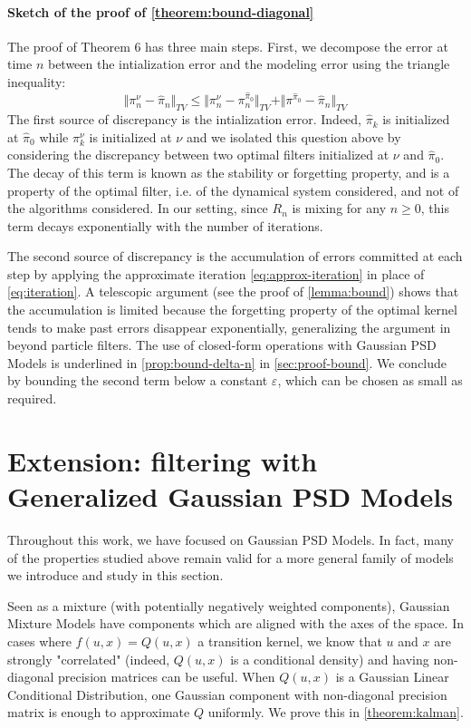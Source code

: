 \paragraph{Sketch of the proof of \cref{theorem:bound-diagonal}}
The proof of Theorem 6 has three main steps. First, we decompose the error at time $n$ between the intialization error and the modeling error using the triangle inequality:
%
\begin{equation*}
\Vert \pi^\nu_n - \hat\pi_n\Vert_{TV} \leq \Vert\pi^\nu_n - \pi^{\hat \pi_0}_n\Vert_{TV} + \Vert\pi^{\hat\pi_0} - \hat \pi_n\Vert_{TV}
\end{equation*}
%
The first source of discrepancy is the intialization error. Indeed, $\hat\pi_k$ is initialized at $\hat \pi_0$ while $\pi_k^\nu$ is initialized at $\nu$ and we isolated this question above by considering the discrepancy between two optimal filters initialized at $\nu$ and $\hat \pi_0$. The decay of this term is known as the stability or forgetting property, and is a property of the optimal filter, i.e. of the dynamical system considered, and not of the algorithms considered. In our setting, since $R_n$ is mixing for any $n\geq 0$, this term decays exponentially with the number of iterations.

The second source of discrepancy is the accumulation of errors committed at each step by applying the approximate iteration \cref{eq:approx-iteration} in place of \cref{eq:iteration}. A telescopic argument (see the proof of \cref{lemma:bound}) shows that the accumulation is limited because the forgetting property of the optimal kernel tends to make past errors disappear exponentially, generalizing the argument in \cite{oudjane} beyond particle filters. The use of closed-form operations with Gaussian PSD Models is underlined in \cref{prop:bound-delta-n} in \cref{sec:proof-bound}. We conclude by bounding the second term below a constant $\varepsilon$, which can be chosen as small as required.

\section{Extension: filtering with Generalized Gaussian PSD Models}\label{sec:generalized-psd-models}
Throughout this work, we have focused on Gaussian PSD Models. In fact, many of the properties studied above remain valid for a more general family of models we introduce and study in this section.

Seen as a mixture (with potentially negatively weighted components), Gaussian Mixture Models have components which are aligned with the axes of the space. In cases where $f(u, x) = Q(u, x)$ a transition kernel, we know that $u$ and $x$ are strongly "correlated" (indeed, $Q(u, x)$ is a conditional density) and having non-diagonal precision matrices can be useful. When $Q(u, x)$ is a Gaussian Linear Conditional Distribution, one Gaussian component with non-diagonal precision matrix is enough to approximate $Q$ uniformly. We prove this in \cref{theorem:kalman}.

